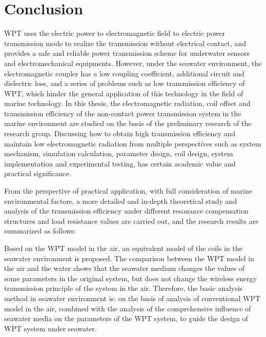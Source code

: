 \chapter{Conclusion}


WPT uses the electric power to electromagnetic field to electric power transmission mode to realize the transmission without electrical contact, and provides a safe and reliable power transmission scheme for underwater sensors and electromechanical equipments. 
However, under the seawater environment, the electromagnetic coupler has a low coupling coefficient, additional circuit and dielectric loss, and a series of problems such as low transmission efficiency of WPT, which hinder the general application of this technology in the field of marine technology. 
In this thesis, the electromagnetic radiation, coil offset and transmission efficiency of the non-contact power transmission system in the marine environment are studied on the basis of the preliminary research of the research group. Discussing how to obtain high transmission efficiency and maintain low electromagnetic radiation from multiple perspectives such as system mechanism, simulation calculation, parameter design, coil design, system implementation and experimental testing, has certain academic value and practical significance.

From the perspective of practical application, with full consideration of marine environmental factors, a more detailed and in-depth theoretical study and analysis of the transmission efficiency under different resonance compensation structures and load resistance values are carried out, and the research results are summarized as follows:

Based on the WPT model in the air, an equivalent model of the coils in the seawater environment is proposed.
The comparison between the WPT model in the air and the water shows that the seawater medium changes the values of some parameters in the original system, but does not change the wireless energy transmission principle of the system in the air.
Therefore, the basic analysis method in seawater environment is: on the basis of analysis of conventional WPT model in the air, combined with the analysis of the comprehensive influence of seawater media on the parameters of the WPT system, to guide the design of WPT system under seawater.

